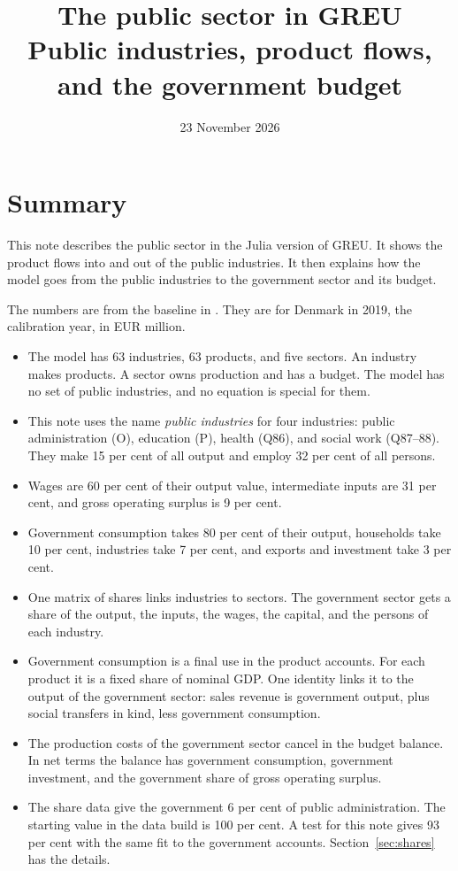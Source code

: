 \documentclass[11pt,a4paper]{article}
\title{The public sector in GREU\\ Public industries, product flows, and the government budget}
\author{}
\date{23 November 2026}
\newcommand{\code}[1]{\texttt{\detokenize{#1}}}
\begin{document}
\maketitle

\section{Summary}

This note describes the public sector in the Julia version of GREU.
It shows the product flows into and out of the public industries.
It then explains how the model goes from the public industries to the government sector and its budget.

The numbers are from the baseline in \code{Output/baseline.parquet}.
They are for Denmark in 2019, the calibration year, in EUR million.

\begin{itemize}
\item The model has 63 industries, 63 products, and five sectors. An industry makes products. A sector owns production and has a budget. The model has no set of public industries, and no equation is special for them.
\item This note uses the name \emph{public industries} for four industries: public administration (O), education (P), health (Q86), and social work (Q87--88). They make 15 per cent of all output and employ 32 per cent of all persons.
\item Wages are 60 per cent of their output value, intermediate inputs are 31 per cent, and gross operating surplus is 9 per cent.
\item Government consumption takes 80 per cent of their output, households take 10 per cent, industries take 7 per cent, and exports and investment take 3 per cent.
\item One matrix of shares links industries to sectors. The government sector gets a share of the output, the inputs, the wages, the capital, and the persons of each industry.
\item Government consumption is a final use in the product accounts. For each product it is a fixed share of nominal GDP. One identity links it to the output of the government sector: sales revenue is government output, plus social transfers in kind, less government consumption.
\item The production costs of the government sector cancel in the budget balance. In net terms the balance has government consumption, government investment, and the government share of gross operating surplus.
\item The share data give the government 6 per cent of public administration. The starting value in the data build is 100 per cent. A test for this note gives 93 per cent with the same fit to the government accounts. Section~\ref{sec:shares} has the details.
\end{itemize}
\end{document}
